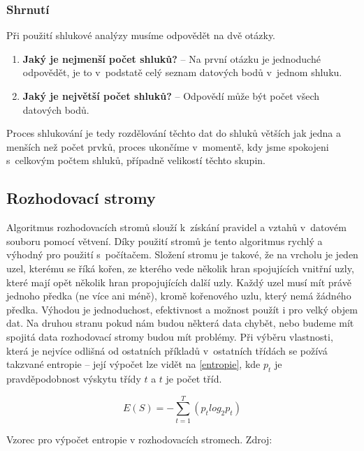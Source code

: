 \subsubsection{Shrnutí}
\par Při použití shlukové analýzy musíme odpovědět na dvě otázky.
\begin{enumerate}
  \item \textbf{Jaký je nejmenší počet shluků?} -- Na první otázku je jednoduché odpovědět, je to v~podstatě celý seznam datových bodů v~jednom shluku.
  \item \textbf{Jaký je největší počet shluků?} -- Odpovědí může být počet všech datových bodů.
\end{enumerate}
Proces shlukování je tedy rozdělování těchto dat do shluků větších jak jedna a menších než počet prvků, proces ukončíme v~momentě, kdy jsme spokojeni s~celkovým počtem shluků, případně velikostí těchto skupin. \cite{data-mining-practical}

\subsection{Rozhodovací stromy}
\par Algoritmus rozhodovacích stromů slouží k~získání pravidel a vztahů v~datovém souboru pomocí větvení. Díky použití stromů je tento algoritmus rychlý a výhodný pro použití s~počítačem. Složení stromu je takové, že na vrcholu je jeden uzel, kterému se říká kořen, ze kterého vede několik hran spojujících vnitřní uzly, které mají opět několik hran propojujících další uzly. Každý uzel musí mít právě jednoho předka (ne více ani méně), kromě kořenového uzlu, který nemá žádného předka. Výhodou je jednoduchost, efektivnost a možnost použít i pro velký objem dat. Na druhou stranu pokud nám budou některá data chybět, nebo budeme mít spojitá data rozhodovací stromy budou mít problémy. \cite{data-mining-principles} Při výběru vlastnosti, která je nejvíce odlišná od ostatních příkladů v~ostatních třídách se požívá takzvané entropie -- její výpočet lze vidět na \ref{entropie}, kde \(p_t\) je pravděpodobnost výskytu třídy \(t\) a \(t\) je počet tříd.
\begin{equationcap}
\begin{equation} \label{entropie}
E(S) = - \sum_{t=1}^{T}(p_t log_2 p_t)
\end{equation}
\caption[Vzorec pro výpočet entropie v~rozhodovacích stromech]{Vzorec pro výpočet entropie v rozhodovacích stromech. Zdroj: \cite{data-mining-principles}}
\end{equationcap}

